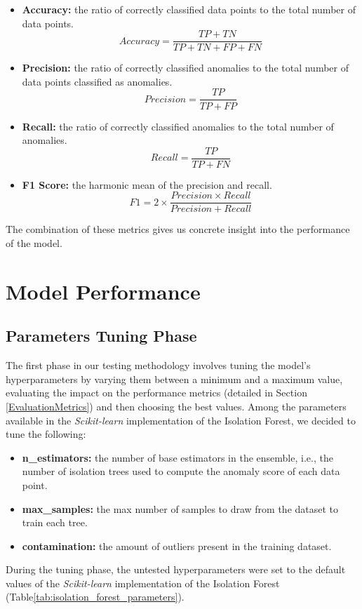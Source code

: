 \documentclass[futureinternet,article,submit,pdftex,moreauthors]{Definitions/mdpi}
\begin{document}
\begin{itemize}
	\item \textbf{Accuracy:} the ratio of correctly classified data points to the total number of data points.
	\begin{equation}
		\label{eq:accuracy}
	  Accuracy = \frac{TP + TN}{TP + TN + FP + FN}
	\end{equation}
	\item \textbf{Precision:} the ratio of correctly classified anomalies to the total number of data points classified as anomalies.
	\begin{equation}
		\label{eq:precision}
	  Precision = \frac{TP}{TP + FP}
	\end{equation}
	\item \textbf{Recall:} the ratio of correctly classified anomalies to the total number of anomalies.
	\begin{equation}
		\label{eq:recall}
	  Recall = \frac{TP}{TP + FN}
	\end{equation}
	\item \textbf{F1 Score:} the harmonic mean of the precision and recall.
	\begin{equation}
		\label{eq:f1}
	  F1 = 2 \times \frac{Precision \times Recall}{Precision + Recall}
	\end{equation}
\end{itemize}
The combination of these metrics gives us concrete insight into the performance of the model. 

\section{Model Performance }

\subsection{Parameters Tuning Phase}

The first phase in our testing methodology involves tuning the model's hyperparameters by varying them between a minimum and a maximum value, evaluating the impact on the performance metrics (detailed in Section \ref{EvaluationMetrics}) and then choosing the best values.
Among the parameters available in the \textit{Scikit-learn} implementation of the Isolation Forest, we decided to tune the following: 

\begin{itemize}
	\item \textbf{n\_estimators:} the number of base estimators in the ensemble, i.e., the number of isolation trees used to compute the anomaly score of each data point. 
	\item \textbf{max\_samples:} the max number of samples to draw from the dataset to train each tree.
	\item \textbf{contamination:} the amount of outliers present in the training dataset.  
\end{itemize} 
During the tuning phase, the untested hyperparameters were set to the default values of the \textit{Scikit-learn} implementation of the Isolation Forest (Table\ref{tab:isolation_forest_parameters}).
\end{document}

